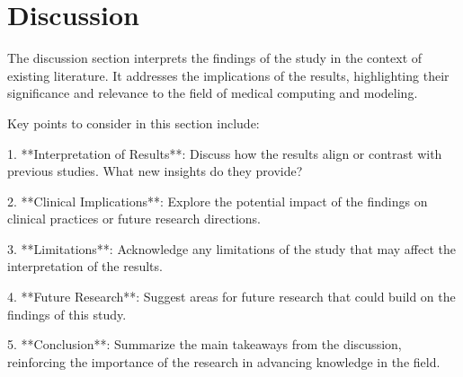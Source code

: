 
\section{Discussion}

The discussion section interprets the findings of the study in the context of existing literature. It addresses the implications of the results, highlighting their significance and relevance to the field of medical computing and modeling. 

Key points to consider in this section include:

1. **Interpretation of Results**: Discuss how the results align or contrast with previous studies. What new insights do they provide?

2. **Clinical Implications**: Explore the potential impact of the findings on clinical practices or future research directions.

3. **Limitations**: Acknowledge any limitations of the study that may affect the interpretation of the results.

4. **Future Research**: Suggest areas for future research that could build on the findings of this study.

5. **Conclusion**: Summarize the main takeaways from the discussion, reinforcing the importance of the research in advancing knowledge in the field.